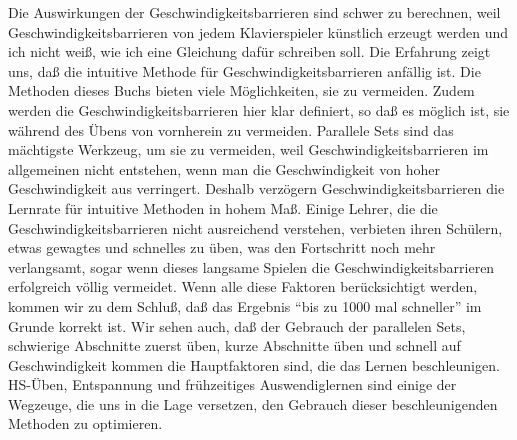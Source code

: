 Die Auswirkungen der Geschwindigkeitsbarrieren sind schwer zu berechnen, weil Geschwindigkeitsbarrieren von jedem Klavierspieler künstlich erzeugt werden und ich nicht weiß, wie ich eine Gleichung dafür schreiben soll.
Die Erfahrung zeigt uns, daß die intuitive Methode für Geschwindigkeitsbarrieren anfällig ist.
Die Methoden dieses Buchs bieten viele Möglichkeiten, sie zu vermeiden.
Zudem werden die Geschwindigkeitsbarrieren hier klar definiert, so daß es möglich ist, sie während des Übens von vornherein zu vermeiden.
Parallele Sets sind das mächtigste Werkzeug, um sie zu vermeiden, weil Geschwindigkeitsbarrieren im allgemeinen nicht entstehen, wenn man die Geschwindigkeit von hoher Geschwindigkeit aus verringert.
Deshalb verzögern Geschwindigkeitsbarrieren die Lernrate für intuitive Methoden in hohem Maß.
Einige Lehrer, die die Geschwindigkeitsbarrieren nicht ausreichend verstehen, verbieten ihren Schülern, etwas gewagtes und schnelles zu üben, was den Fortschritt noch mehr verlangsamt, sogar wenn dieses langsame Spielen die Geschwindigkeitsbarrieren erfolgreich völlig vermeidet.
Wenn alle diese Faktoren berücksichtigt werden, kommen wir zu dem Schluß, daß das Ergebnis \enquote{bis zu 1000 mal schneller} im Grunde korrekt ist.
Wir sehen auch, daß der Gebrauch der parallelen Sets, schwierige Abschnitte zuerst üben, kurze Abschnitte üben und schnell auf Geschwindigkeit kommen die Hauptfaktoren sind, die das Lernen beschleunigen.
HS-Üben, Entspannung und frühzeitiges Auswendiglernen sind einige der Wegzeuge, die uns in die Lage versetzen, den Gebrauch dieser beschleunigenden Methoden zu optimieren.

